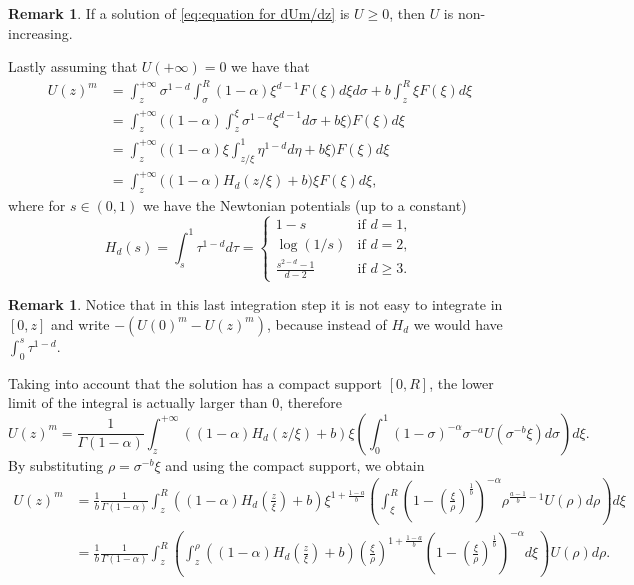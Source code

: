 \documentclass[a4paper]{article}
\theoremstyle{definition}
\newtheorem{remark}[theorem]{Remark}
\begin{document}
\begin{remark}
  \label{rem:decreasing}
  If a solution of \eqref{eq:equation for dUm/dz}
  is $U \ge 0$,  then $U$ is non-increasing.
\end{remark}
Lastly assuming that $U(+\infty) = 0$ we have that
\begin{equation}
  \label{eq:implicit equation last formula with F}
  \begin{aligned}
    U(z)^{m} & = \int_z^{+\infty} \sigma^{1-d} \int_\sigma^R ({1-\alpha}) \xi^{d-1} F(\xi) d \xi d \sigma + b \int_{z}^R \xi F(\xi)d\xi \\
    & = \int_z^{+\infty} \Bigg( ({1-\alpha}) \int_z^\xi \sigma^{1-d} \xi^{d-1} d \sigma + b \xi \Bigg) F(\xi) d \xi            \\
    & = \int_z^{+\infty} \Bigg( ({1-\alpha}) \xi \int_{z/\xi}^1 \eta^{1-d} d \eta + b \xi \Bigg) F(\xi) d \xi                  \\
    & = \int_z^{+\infty} \Bigg(({1-\alpha}) H_d(z/\xi) + b \Bigg)\xi F(\xi) d \xi,
  \end{aligned}
\end{equation}
where for $s \in (0,1)$ we have the Newtonian potentials (up to a constant)
\[
  H_d(s) = \int_{s}^1 \tau^{1-d} d\tau =
  \begin{cases}
    1-s                   & \text{if } d=1,     \\
    \log (1/s)            & \text{if } d = 2,   \\
    \frac{s^{2-d}-1}{d-2} & \text{if } d \ge 3.
  \end{cases}
\]
\begin{remark}
  Notice that in this last integration step it is not easy to integrate in $[0,z]$ and write $-(U(0)^{m} - U(z)^{m})$, because instead of $H_d$ we would have $\int_0^s \tau^{1-d}$.
\end{remark}
Taking into account that the solution has a compact support $[0,R]$, the lower limit of the integral is actually larger than $0$, therefore
\[
  U(z)^{m} = \frac{1}{\Gamma(1-\alpha)}\int_z^{+\infty} \left(({1-\alpha}) H_d(z/\xi) + b  \right) \xi\left( \int_{0}^1 (1-\sigma)^{-\alpha} \sigma^{-a} U(\sigma^{-b} \xi) d \sigma \right) d \xi.
\]
By substituting $\rho = \sigma^{-b}\xi$ and using the compact support, we obtain
\[
  \begin{split}
    U(z)^{m}
    & = \frac{1}{b}\frac{1}{\Gamma(1-\alpha)}\int_z^R \left(({1-\alpha}) H_d(\tfrac z \xi) + b \right) \xi^{1 + \frac{1-a}{b}} \left( \int_\xi^R \left(1-\left(\tfrac{\xi}{\rho}\right)^\frac{1}{b}\right)^{-\alpha} \rho^{\frac{a-1}{b}-1} U(\rho)d\rho\right) d \xi                        \\
    & = \frac{1}{b}\frac{1}{\Gamma(1-\alpha)}\int_z^R \left(\int_z^\rho \left(({1-\alpha}) H_d\left(\tfrac{z}{\xi}\right) + b \right) \left(\tfrac{\xi}{\rho}\right)^{1 + \frac{1-a}{b}} \left(1-\left(\tfrac{\xi}{\rho}\right)^\frac{1}{b}\right)^{-\alpha}d\xi \right)  U(\rho)d\rho.
  \end{split}
\]
\end{document}
